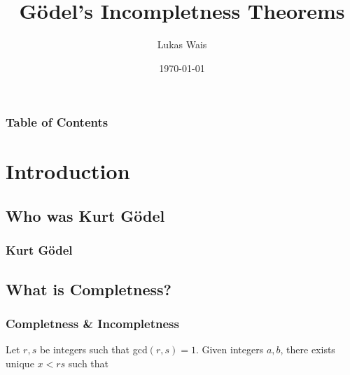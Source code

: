 \documentclass[aspectratio=169]{beamer}
\title{Gödel's Incompletness Theorems}
\author{Lukas Wais}
\institute{Course 326.901}
\date{\today}
\begin{document}
\frame{\titlepage}
\begin{frame}
	\frametitle{Table of Contents}
	\tableofcontents
\end{frame}
\section{Introduction}
\subsection{Who was Kurt Gödel}
\begin{frame}
	\frametitle{Kurt Gödel}
\end{frame}
\subsection{What is Completness?}
\begin{frame}
	\frametitle{Completness \& Incompletness}
	 \begin{theorem}
         Let $r, s$ be integers such that gcd$(r, s)=1$. 
        Given integers $a,b$, there exists unique 
        $x <rs$ such that 
     \end{theorem} 
\end{frame}
\end{document}
